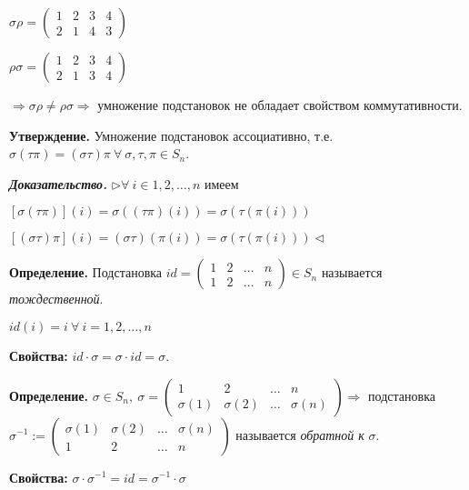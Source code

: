 $\sigma \rho = \begin{pmatrix} 1 & 2 & 3 & 4 \\ 2 & 1 & 4 & 3 \end{pmatrix}$

$\rho \sigma = \begin{pmatrix} 1 & 2 & 3 & 4 \\ 2 & 1 & 3 & 4 \end{pmatrix}$

$\Rightarrow \sigma \rho \neq \rho \sigma \Rightarrow$ умножение подстановок не обладает свойством коммутативности.

\vspace{\baselineskip}
\textbf{Утверждение.} Умножение подстановок ассоциативно, т.е. $\sigma (\tau \pi) = (\sigma \tau) \pi \ \forall \ \sigma, \tau, \pi \in S_n$. 

\vspace{\baselineskip}
\textbf{\textit{Доказательство.}} $\rhd \forall \ i \in 1, 2, \dots, n$ имеем

$[\sigma (\tau \pi)](i) = \sigma ((\tau \pi)(i)) = \sigma (\tau (\pi (i)))$

$[(\sigma \tau) \pi] (i) = (\sigma \tau) (\pi(i)) = \sigma (\tau (\pi(i))) \lhd$

\vspace{\baselineskip}
\textbf{Определение.} Подстановка $id = \begin{pmatrix} 1 & 2 & \dots & n \\ 1 & 2 & \dots & n \end{pmatrix} \in S_n$ называется \textit{тождественной}.

$id(i) = i \ \forall \ i=1, 2, \dots, n$

\vspace{\baselineskip}
\textbf{Свойства:} $id \cdot \sigma = \sigma \cdot id = \sigma$.

\vspace{\baselineskip}
\textbf{Определение.} $\sigma \in S_n, \ \sigma = \begin{pmatrix} 1 & 2 & \dots & n \\ \sigma (1) & \sigma (2) & \dots & \sigma (n) \end{pmatrix} \Rightarrow$ подстановка $\sigma^{-1} := \begin{pmatrix} \sigma (1) & \sigma (2) & \dots & \sigma (n) \\ 1 & 2 & \dots & n \end{pmatrix}$ называется \textit{обратной к} $\sigma$.

\vspace{\baselineskip}
\textbf{Свойства:} $\sigma \cdot \sigma^{-1} = id = \sigma^{-1} \cdot \sigma$

